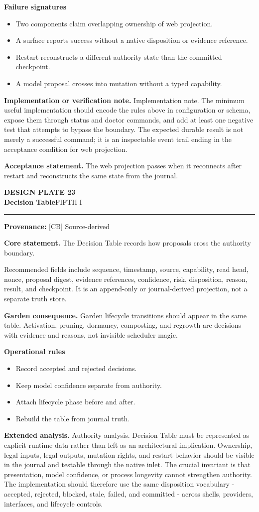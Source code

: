 \documentclass[10pt,letterpaper,oneside]{article}
\newcommand{\prov}[1]{\textcolor{gardenBlue}{\sffamily\footnotesize\textbf{Provenance:} #1}}
\newcommand{\platetitle}[3]{%
  \begin{minipage}[t][0.54in][t]{\textwidth}
  {\sffamily\bfseries\color{gardenDeep}\fontsize{9}{10}\selectfont DESIGN PLATE #1}\\[-1pt]
  {\sffamily\bfseries\color{gardenInk}\fontsize{16.5}{18}\selectfont #2}\hfill{\sffamily\color{gardenGreen}\large #3}
  \end{minipage}\vspace{-2pt}\hrule\vspace{5pt}}
\begin{document}
\textbf{Failure signatures}
\begin{itemize}
\item Two components claim overlapping ownership of web projection.
\item A surface reports success without a native disposition or evidence reference.
\item Restart reconstructs a different authority state than the committed checkpoint.
\item A model proposal crosses into mutation without a typed capability.
\end{itemize}
\textbf{Implementation or verification note.} Implementation note. The minimum useful implementation should encode the rules above in configuration or schema, expose them through status and doctor commands, and add at least one negative test that attempts to bypass the boundary. The expected durable result is not merely a successful command; it is an inspectable event trail ending in the acceptance condition for web projection.

\begin{acceptbox}
\textbf{Acceptance statement.} The web projection passes when it reconnects after restart and reconstructs the same state from the journal.
\end{acceptbox}
\newpage
\platetitle{23}{Decision Table}{FIFTH I}
\prov{[CB] Source-derived}
\fontsize{8.85}{10.45}\selectfont
\begin{corebox}
\textbf{Core statement.} The Decision Table records how proposals cross the authority boundary.
\end{corebox}
Recommended fields include sequence, timestamp, source, capability, read head, nonce, proposal digest, evidence references, confidence, risk, disposition, reason, result, and checkpoint. It is an append-only or journal-derived projection, not a separate truth store.

\textbf{Garden consequence.} Garden lifecycle transitions should appear in the same table. Activation, pruning, dormancy, composting, and regrowth are decisions with evidence and reasons, not invisible scheduler magic.

\textbf{Operational rules}
\begin{itemize}
\item Record accepted and rejected decisions.
\item Keep model confidence separate from authority.
\item Attach lifecycle phase before and after.
\item Rebuild the table from journal truth.
\end{itemize}
\textbf{Extended analysis.} Authority analysis. Decision Table must be represented as explicit runtime data rather than left as an architectural implication. Ownership, legal inputs, legal outputs, mutation rights, and restart behavior should be visible in the journal and testable through the native inlet. The crucial invariant is that presentation, model confidence, or process longevity cannot strengthen authority. The implementation should therefore use the same disposition vocabulary - accepted, rejected, blocked, stale, failed, and committed - across shells, providers, interfaces, and lifecycle controls.
\end{document}
